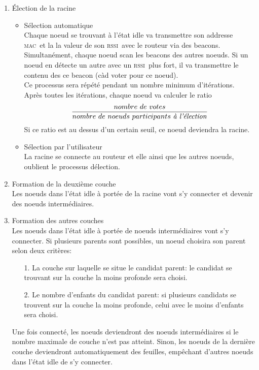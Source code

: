 \documentclass[a4paper, 12pt]{report}
\newcommand{\mac}{\textsc{mac}}
\newcommand{\rssi}{\textsc{rssi}}
\begin{document}
    \begin{enumerate}
        \item \'Election de la racine
            \begin{itemize}
                \item Sélection automatique\\
                    Chaque noeud se trouvant à l'état idle va transmettre son addresse \mac\ et la
                    la valeur de son \rssi\ avec le routeur via des beacons.\\
                    Simultanément, chaque noeud scan les beacons des autres noeuds. Si un noeud
                    en détecte un autre avec un \rssi\ plus fort, il va transmettre le contenu des
                    ce beacon (càd voter pour ce noeud).\\
                    Ce processus sera répété pendant un nombre minimum d'itérations.\\
                    Après toutes les itérations, chaque noeud va calculer le ratio
                    \[\frac{nombre\ de\ votes}{nombre\ de\ noeuds\ participants\ \textrm{\textit{à l'élection}}}\]
                    Si ce ratio est au dessus d'un certain seuil, ce noeud deviendra la racine.

                \item Sélection par l'utilisateur\\
                    La racine se connecte au routeur et elle ainsi que les autres noeuds, oublient le processus
                    délection.
            \end{itemize}
        \item Formation de la deuxième couche\\
            Les noeuds dans l'état idle à portée de la racine vont s'y connecter et devenir des noeuds intermédiaires.
        
        \item Formation des autres couches\\
            Les noeuds dans l'état idle à portée de noeuds intermédiaires vont s'y connecter. Si plusieurs parents
            sont possibles, un noeud choisira son parent selon deux critères:
            \begin{enumerate}
                \addtolength{\itemindent}{1cm}
                \item[1.] La couche sur laquelle se situe le candidat parent:
                    le candidat se trouvant sur la couche la moins profonde sera choisi. 
                \item[2.] Le nombre d'enfants du candidat parent: si plusieurs candidats se trouvent
                    sur la couche la moins profonde, celui avec le moins d'enfants sera choisi. 
            \end{enumerate}
            Une fois connecté, les noeuds deviendront des noeuds intermédiaires si le nombre maximale de couche n'est pas atteint.
            Sinon, les noeuds de la dernière couche deviendront automatiquement
            des feuilles, empêchant d'autres noeuds dans l'état idle de s'y connecter.

    \end{enumerate}
\end{document}
